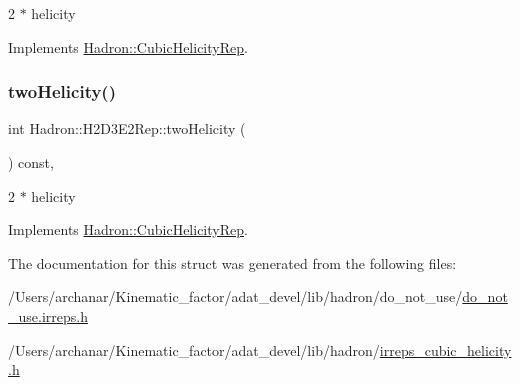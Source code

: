 2 $\ast$ helicity 

Implements \mbox{\hyperlink{structHadron_1_1CubicHelicityRep_af507aa56fc2747eacc8cb6c96db31ecc}{Hadron\+::\+Cubic\+Helicity\+Rep}}.

\mbox{\label{structHadron_1_1H2D3E2Rep_a85b69c72b8a1e18f12947d11de0e6561}} 
\subsubsection{\texorpdfstring{twoHelicity()}{twoHelicity()}\hspace{0.1cm}{\footnotesize\ttfamily [2/2]}}
{\footnotesize\ttfamily int Hadron\+::\+H2\+D3\+E2\+Rep\+::two\+Helicity (\begin{DoxyParamCaption}{ }\end{DoxyParamCaption}) const\hspace{0.3cm}{\ttfamily [inline]}, {\ttfamily [virtual]}}

2 $\ast$ helicity 

Implements \mbox{\hyperlink{structHadron_1_1CubicHelicityRep_af507aa56fc2747eacc8cb6c96db31ecc}{Hadron\+::\+Cubic\+Helicity\+Rep}}.



The documentation for this struct was generated from the following files\+:\begin{DoxyCompactItemize}
\item 
/\+Users/archanar/\+Kinematic\+\_\+factor/adat\+\_\+devel/lib/hadron/do\+\_\+not\+\_\+use/\mbox{\hyperlink{do__not__use_8irreps_8h}{do\+\_\+not\+\_\+use.\+irreps.\+h}}\item 
/\+Users/archanar/\+Kinematic\+\_\+factor/adat\+\_\+devel/lib/hadron/\mbox{\hyperlink{lib_2hadron_2irreps__cubic__helicity_8h}{irreps\+\_\+cubic\+\_\+helicity.\+h}}\end{DoxyCompactItemize}
